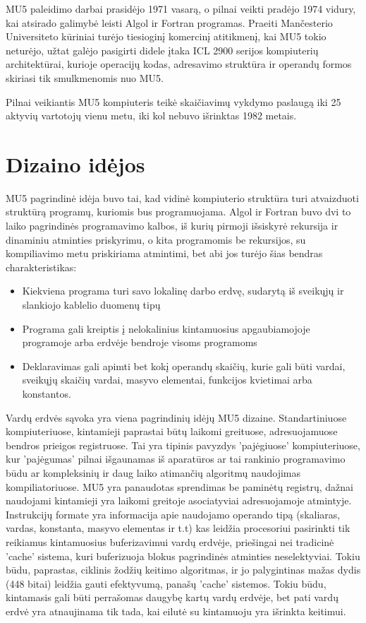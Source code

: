 \documentclass[a4paper,lithuanian]{article}
\begin{document}
MU5 paleidimo darbai prasidėjo 1971 vasarą, o pilnai veikti pradėjo 1974 vidury, kai atsirado galimybė leisti Algol ir Fortran programas. Praeiti Mančesterio Universiteto kūriniai turėjo tiesioginį komercinį atitikmenį, kai MU5 tokio neturėjo, užtat galėjo pasigirti didele įtaka ICL 2900 serijos kompiuterių architektūrai, kurioje operacijų kodas, adresavimo struktūra ir operandų formos skiriasi tik smulkmenomis nuo MU5. \newline

Pilnai veikiantis MU5 kompiuteris teikė skaičiavimų vykdymo paslaugą iki 25 aktyvių vartotojų vienu metu, iki kol nebuvo išrinktas 1982 metais.




\section{Dizaino idėjos}

MU5 pagrindinė idėja buvo tai, kad vidinė kompiuterio struktūra turi atvaizduoti struktūrą programų, kuriomis bus programuojama. Algol ir Fortran buvo dvi to laiko pagrindinės programavimo kalbos, iš kurių pirmoji išsiskyrė rekursija ir dinaminiu atminties priskyrimu, o kita programomis be rekursijos, su kompiliavimo metu priskiriama atmintimi, bet abi jos turėjo šias bendras charakteristikas:

\begin{itemize}
\item Kiekviena programa turi savo lokalinę darbo erdvę, sudarytą iš sveikųjų ir slankiojo kablelio duomenų tipų
\item Programa gali kreiptis į nelokalinius kintamuosius apgaubiamojoje programoje arba erdvėje bendroje visoms programoms
\item Deklaravimas gali apimti bet kokį operandų skaičių, kurie gali būti vardai, sveikųjų skaičių vardai, masyvo elementai, funkcijos kvietimai arba konstantos.
\end{itemize}

Vardų erdvės sąvoka yra viena pagrindinių idėjų MU5 dizaine. Standartiniuose kompiuteriuose, kintamieji paprastai būtų laikomi greituose, adresuojamuose bendros prieigos registruose. Tai yra tipinis pavyzdys 'pajėgiuose' kompiuteriuose, kur 'pajėgumas' pilnai išgaunamas iš aparatūros ar tai rankinio programavimo būdu ar kompleksinių ir daug laiko atimančių algoritmų naudojimas kompiliatoriuose. MU5 yra panaudotas sprendimas be paminėtų registrų, dažnai naudojami kintamieji yra laikomi greitoje asociatyviai adresuojamoje atmintyje. Instrukcijų formate yra informacija apie naudojamo operando tipą (skaliaras, vardas, konstanta, masyvo elementas ir t.t) kas leidžia procesoriui pasirinkti tik reikiamus kintamuosius buferizavimui vardų erdvėje, priešingai nei tradicinė 'cache' sistema, kuri buferizuoja blokus pagrindinės atminties neselektyviai. Tokiu būdu, paprastas, ciklinis žodžių keitimo algoritmas, ir jo palygintinas mažas dydis (448 bitai) leidžia gauti efektyvumą, panašų 'cache' sistemos. Tokiu būdu, kintamasis gali būti perrašomas daugybę kartų vardų erdvėje, bet pati vardų erdvė yra atnaujinama tik tada, kai eilutė su kintamuoju yra išrinkta keitimui. 
\end{document}
